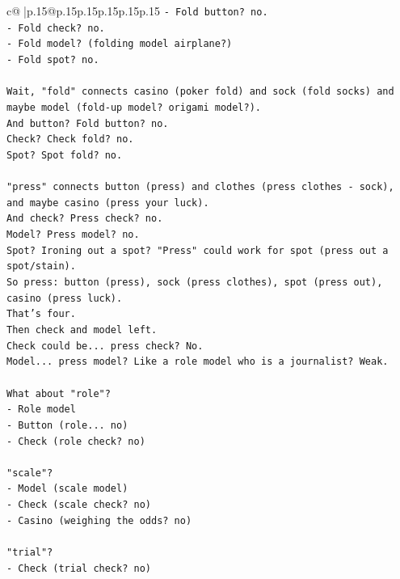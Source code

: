 \documentclass{article}
\begin{document}
{\begin{supertabular}{c@{$\;$}|p{.15\linewidth}@{}p{.15\linewidth}p{.15\linewidth}p{.15\linewidth}p{.15\linewidth}p{.15\linewidth}}
{{{\texttt{{-} Fold button? no.} \\
\texttt{{-} Fold check? no.} \\
\texttt{{-} Fold model? (folding model airplane?)} \\
\texttt{{-} Fold spot? no.} \\
\\ 
\texttt{Wait, "fold" connects casino (poker fold) and sock (fold socks) and maybe model (fold{-}up model? origami model?).} \\
\texttt{And button? Fold button? no.} \\
\texttt{Check? Check fold? no.} \\
\texttt{Spot? Spot fold? no.} \\
\\ 
\texttt{"press" connects button (press) and clothes (press clothes {-} sock), and maybe casino (press your luck).} \\
\texttt{And check? Press check? no.} \\
\texttt{Model? Press model? no.} \\
\texttt{Spot? Ironing out a spot? "Press" could work for spot (press out a spot/stain).} \\
\texttt{So press: button (press), sock (press clothes), spot (press out), casino (press luck).} \\
\texttt{That's four.} \\
\texttt{Then check and model left.} \\
\texttt{Check could be... press check? No.} \\
\texttt{Model... press model? Like a role model who is a journalist? Weak.} \\
\\ 
\texttt{What about "role"?} \\
\texttt{{-} Role model} \\
\texttt{{-} Button (role... no)} \\
\texttt{{-} Check (role check? no)} \\
\\ 
\texttt{"scale"?} \\
\texttt{{-} Model (scale model)} \\
\texttt{{-} Check (scale check? no)} \\
\texttt{{-} Casino (weighing the odds? no)} \\
\\ 
\texttt{"trial"?} \\
\texttt{{-} Check (trial check? no)} \\
\\ 
}}}
\end{supertabular}}
\end{document}
